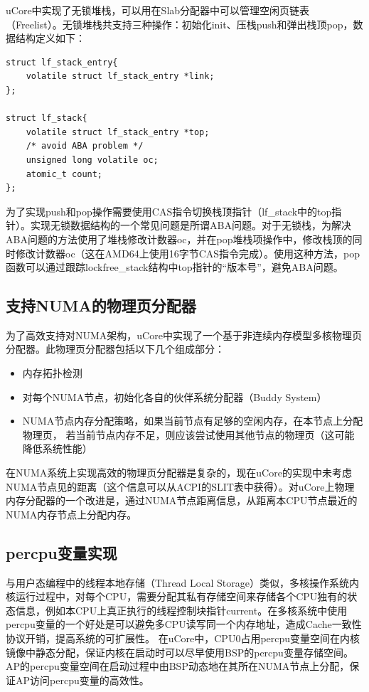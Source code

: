 uCore中实现了无锁堆栈，可以用在Slab分配器中可以管理空闲页链表（Freelist）。无锁堆栈共支持三种操作：初始化init、压栈push和弹出栈顶pop，数据结构定义如下：

\begin{Code}
	\centering
\begin{lstlisting}
struct lf_stack_entry{
	volatile struct lf_stack_entry *link;
};

struct lf_stack{
	volatile struct lf_stack_entry *top;
	/* avoid ABA problem */
	unsigned long volatile oc;
	atomic_t count;
};
\end{lstlisting}

\end{Code}
为了实现push和pop操作需要使用CAS指令切换栈顶指针（lf\_stack中的top指针）。实现无锁数据结构的一个常见问题是所谓ABA问题\cite{Fraser:2007:CPW:1233307.1233309}。对于无锁栈，为解决ABA问题的方法使用了堆栈修改计数器oc，并在pop堆栈项操作中，修改栈顶的同时修改计数器oc（这在AMD64上使用16字节CAS指令完成）。使用这种方法，pop函数可以通过跟踪lockfree\_stack结构中top指针的``版本号''，避免ABA问题。

\subsection{支持NUMA的物理页分配器}
为了高效支持对NUMA架构，uCore中实现了一个基于非连续内存模型多核物理页分配器。此物理页分配器包括以下几个组成部分：
\begin{itemize}
	\item 内存拓扑检测
	\item 对每个NUMA节点，初始化各自的伙伴系统分配器（Buddy System）
	\item
		NUMA节点内存分配策略，如果当前节点有足够的空闲内存，在本节点上分配物理页，
		若当前节点内存不足，则应该尝试使用其他节点的物理页（这可能降低系统性能）
\end{itemize}

在NUMA系统上实现高效的物理页分配器是复杂的，现在uCore的实现中未考虑NUMA节点见的距离（这个信息可以从ACPI的SLIT表中获得）。对uCore上物理内存分配器的一个改进是，通过NUMA节点距离信息，从距离本CPU节点最近的NUMA内存节点上分配内存。

\subsection{percpu变量实现}
\label{subsec:percpu}

与用户态编程中的线程本地存储（Thread Local Storage）类似，多核操作系统内核运行过程中，对每个CPU，需要分配其私有存储空间来存储各个CPU独有的状态信息，例如本CPU上真正执行的线程控制块指针current。在多核系统中使用percpu变量的一个好处是可以避免多CPU读写同一个内存地址，造成Cache一致性协议开销，提高系统的可扩展性。
在uCore中，CPU0占用percpu变量空间在内核镜像中静态分配，保证内核在启动时可以尽早使用BSP的percpu变量存储空间。AP的percpu变量空间在启动过程中由BSP动态地在其所在NUMA节点上分配，保证AP访问percpu变量的高效性。


